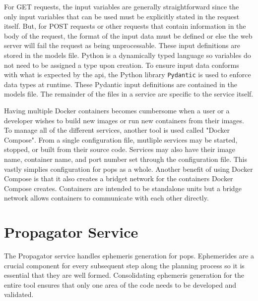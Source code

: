 For GET requests, the input variables are generally straightforward since the
only input variables that can be used must be explicitly stated in the request
itself. But, for POST requests or other requests that contain information in
the body of the request, the format of the input data must be defined or else
the web server will fail the request as being unprocessable. These input
definitions are stored in the models file. Python is a dynamically typed
language so variables do not need to be assigned a type upon creation. To
ensure input data conforms with what is expected by the api, the Python library
\texttt{Pydantic} is used to enforce data types at runtime. These Pydantic
input definitions are contained in the models file. The remainder of the files
in a service are specific to the service itself.

Having multiple Docker containers becomes cumbersome when a user or a developer
wishes to build new images or run new containers from their images. To manage
all of the different services, another tool is used called "Docker Compose".
From a single configuration file, mutliple services may be started, stopped, or
built from their source code. Services may also have their image name,
container name, and port number set through the configuration file. This vastly
simplies configuration for \gls{pops} as a whole. Another benefit of using
Docker Compose is that it also creates a bridget network for the containers
Docker Compose creates. Containers are intended to be standalone units but a
bridge network allows containers to communicate with each other directly.


\section{Propagator Service}

The Propagator service handles ephemeris generation for \gls{pops}.
Ephemerides are a crucial component for every subsequent step along the
planning process so it is essential that they are well formed. Consolidating
ephemeris generation for the entire tool ensures that only one area of the code
needs to be developed and validated.

